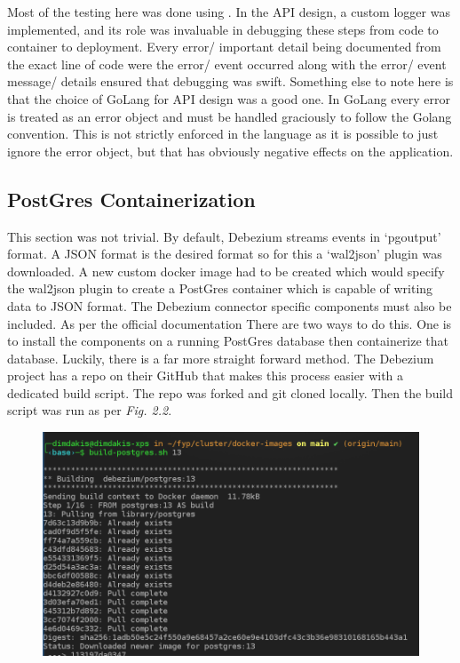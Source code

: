 \begin{flushleft}
    Most of the testing here was done using .\newline
    In the API design, a custom logger was implemented, and its role was invaluable in debugging these steps from code to container to deployment.
    Every error/ important detail being documented from the exact line of code were the error/ event occurred along with the error/ event message/ details ensured that
    debugging was swift. Something else to note here is that the choice of GoLang for API design was a good one. In GoLang every error is treated
    as an error object and must be handled graciously to follow the Golang convention. This is not strictly enforced in the language as it is possible
    to just ignore the error object, but that has obviously negative effects on the application.
    \subsection{PostGres Containerization}
    This section was not trivial. By default, Debezium streams events in `pgoutput' format. A JSON format is the desired format so for this a `wal2json' plugin was downloaded.
    A new custom docker image had to be created which would specify the wal2json plugin to create a PostGres container which is capable of writing data to JSON format.
    \newline
    The Debezium connector specific components must also be included. As per the official documentation \autocite{LogicalDecodingOutput} There are two ways to do this.
    \bigbreak
    One is to install the components on a running PostGres database then containerize that database.
    \bigbreak
    Luckily, there is a far more straight forward method. The Debezium project has a repo on their GitHub \autocite{DockerimagesPostgres13} that makes this process easier with a dedicated build script.
    The repo was forked and git cloned locally. Then the build script was run as per \emph{Fig. 2.2}.
    \begin{figure} [ht]
        \begin{center}
            \includegraphics[width=1\textwidth]{figures/building-of-debezigres-image.png}

\end{center}
\end{figure}
\end{flushleft}
